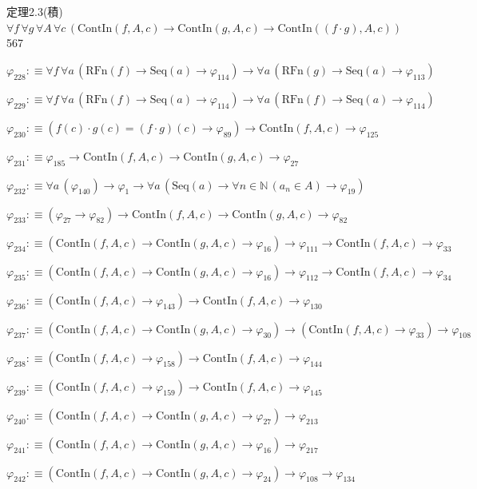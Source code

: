 \begin{fullproof}{定理2.3(積)}{$\forall f\,\forall g\,\forall A\,\forall c\,(\mathrm{ContIn}(f,A,c) \to \mathrm{ContIn}(g,A,c) \to \mathrm{ContIn}((f \cdot g),A,c))$}{567}
\begin{abbrevlist}
\item $\varphi_{228} :\equiv \forall f\,\forall a\,(\mathrm{RFn}(f) \to \mathrm{Seq}(a) \to \varphi_{114}) \to \forall a\,(\mathrm{RFn}(g) \to \mathrm{Seq}(a) \to \varphi_{113})$
\item $\varphi_{229} :\equiv \forall f\,\forall a\,(\mathrm{RFn}(f) \to \mathrm{Seq}(a) \to \varphi_{114}) \to \forall a\,(\mathrm{RFn}(f) \to \mathrm{Seq}(a) \to \varphi_{114})$
\item $\varphi_{230} :\equiv (f(c) \cdot g(c) = (f \cdot g)(c) \to \varphi_{89}) \to \mathrm{ContIn}(f,A,c) \to \varphi_{125}$
\item $\varphi_{231} :\equiv \varphi_{185} \to \mathrm{ContIn}(f,A,c) \to \mathrm{ContIn}(g,A,c) \to \varphi_{27}$
\item $\varphi_{232} :\equiv \forall a\,(\varphi_{140}) \to \varphi_{1} \to \forall a\,(\mathrm{Seq}(a) \to \forall n \in \mathbb{N}\,(a_{n} \in A) \to \varphi_{19})$
\item $\varphi_{233} :\equiv (\varphi_{27} \to \varphi_{82}) \to \mathrm{ContIn}(f,A,c) \to \mathrm{ContIn}(g,A,c) \to \varphi_{82}$
\item $\varphi_{234} :\equiv (\mathrm{ContIn}(f,A,c) \to \mathrm{ContIn}(g,A,c) \to \varphi_{16}) \to \varphi_{111} \to \mathrm{ContIn}(f,A,c) \to \varphi_{33}$
\item $\varphi_{235} :\equiv (\mathrm{ContIn}(f,A,c) \to \mathrm{ContIn}(g,A,c) \to \varphi_{16}) \to \varphi_{112} \to \mathrm{ContIn}(f,A,c) \to \varphi_{34}$
\item $\varphi_{236} :\equiv (\mathrm{ContIn}(f,A,c) \to \varphi_{143}) \to \mathrm{ContIn}(f,A,c) \to \varphi_{130}$
\item $\varphi_{237} :\equiv (\mathrm{ContIn}(f,A,c) \to \mathrm{ContIn}(g,A,c) \to \varphi_{30}) \to (\mathrm{ContIn}(f,A,c) \to \varphi_{33}) \to \varphi_{108}$
\item $\varphi_{238} :\equiv (\mathrm{ContIn}(f,A,c) \to \varphi_{158}) \to \mathrm{ContIn}(f,A,c) \to \varphi_{144}$
\item $\varphi_{239} :\equiv (\mathrm{ContIn}(f,A,c) \to \varphi_{159}) \to \mathrm{ContIn}(f,A,c) \to \varphi_{145}$
\item $\varphi_{240} :\equiv (\mathrm{ContIn}(f,A,c) \to \mathrm{ContIn}(g,A,c) \to \varphi_{27}) \to \varphi_{213}$
\item $\varphi_{241} :\equiv (\mathrm{ContIn}(f,A,c) \to \mathrm{ContIn}(g,A,c) \to \varphi_{16}) \to \varphi_{217}$
\item $\varphi_{242} :\equiv (\mathrm{ContIn}(f,A,c) \to \mathrm{ContIn}(g,A,c) \to \varphi_{24}) \to \varphi_{108} \to \varphi_{134}$

\end{abbrevlist}
\end{fullproof}
